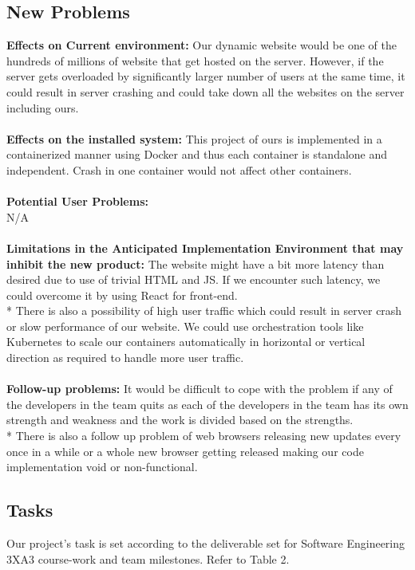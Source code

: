 \documentclass[12pt, titlepage]{article}
\begin{document}
\subsection{New Problems}
\textbf{Effects on Current environment:} Our dynamic website would be one of the hundreds of millions of website that get hosted on the server. However, if the server gets overloaded by significantly larger number of users at the same time, it could result in server crashing and could take down all the websites on the server including ours. \\
\\
\textbf{Effects on the installed system:} This project of ours is implemented in a containerized manner using Docker and thus each container is standalone and independent. Crash in one container would not affect other containers. \\
\\
\textbf{Potential User Problems:}  \\
N/A \\
\\
\textbf{Limitations in the Anticipated Implementation Environment that may inhibit the new product:} The website might have a bit more latency than desired due to use of trivial HTML and JS. If we encounter such latency, we could overcome it by using React for front-end. \\*
There is also a possibility of high user traffic which could result in server crash or slow performance of our website. We could use orchestration tools like Kubernetes to scale our containers automatically in  horizontal or vertical direction as required to handle more user traffic.\\
\\
\textbf{Follow-up problems:} It would be difficult to cope with the problem if any of the developers in the team quits as each of the developers in the team has its own strength and weakness and the work is divided based on the strengths. \\*
There is also a follow up problem of web browsers releasing new updates every once in a while or a whole new browser getting released making our code implementation void or non-functional.

\subsection{Tasks}
Our project's task is set according to the deliverable set for Software Engineering 3XA3 course-work and team milestones. Refer to Table 2.
\end{document}
